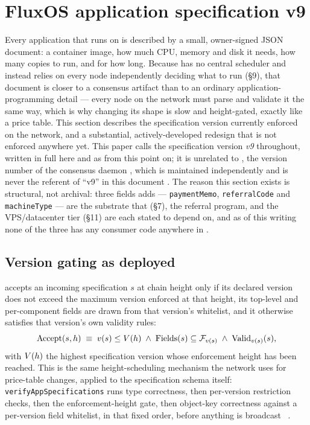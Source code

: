 \section{FluxOS application specification v9}
\label{sec:appspec-v9}

Every application that runs on \Flux is described by a small, owner-signed JSON document: a
container image, how much CPU, memory and disk it needs, how many copies to run, and for how long.
Because \FluxOS has no central scheduler and instead relies on every node independently deciding
what to run (\S9), that document is closer to a consensus artifact than to an ordinary
application-programming detail — every node on the network must parse and validate it the same
way, which is why changing its shape is slow and height-gated, exactly like a price table. This
section describes the specification version currently enforced on the network, and a substantial,
actively-developed redesign that is not enforced anywhere yet. This paper calls the specification
version \emph{v9} throughout, written in full here and as  from this point on; it is
unrelated to \daemonversion, the version number of the consensus daemon \fluxd, which is
maintained independently and is never the referent of ``v9'' in this document
. The reason this section exists is structural, not archival: three fields
 adds — \texttt{paymentMemo}, \texttt{referralCode} and \texttt{machineType} — are the
substrate that \PNR (\S7), the referral program, and the VPS/datacenter tier (\S11) are each stated
to depend on, and as of this writing none of the three has any consumer code anywhere in \FluxOS.

\subsection{Version gating as deployed}

\FluxOS accepts an incoming specification $s$ at chain height \hgt only if its declared version does
not exceed the maximum version enforced at that height, its top-level and per-component fields are
drawn from that version's whitelist, and it otherwise satisfies that version's own validity rules:
$$
\mathrm{Accept}(s,h) \;\equiv\; v(s) \le V(h) \;\wedge\; \mathrm{Fields}(s) \subseteq
\mathcal{F}_{v(s)} \;\wedge\; \mathrm{Valid}_{v(s)}(s),
$$
with $V(h)$ the highest specification version whose enforcement height has been reached. This is
the same height-scheduling mechanism the network uses for price-table changes, applied to the
specification schema itself: \texttt{verify\allowbreak{}App\allowbreak{}Specifications} runs type correctness, then
per-version restriction checks, then the enforcement-height gate, then object-key correctness
against a per-version field whitelist, in that fixed order, before anything is broadcast \shipped\ .

